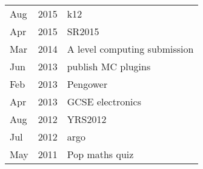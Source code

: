 
\begin{tabu} to \textwidth {X[0.8,l] X[1.5,l] X[25,l]}
    Aug & 2015 & k12 \\
    Apr & 2015 & SR2015 \\
    Mar & 2014 & A level computing submission \\
    Jun & 2013 & publish MC plugins \\
    Feb & 2013 & Pengower \\
    Apr & 2013 & GCSE electronics \\
    Aug & 2012 & YRS2012 \\
    Jul & 2012 & argo \\
    May & 2011 & Pop maths quiz \\
\end{tabu}
